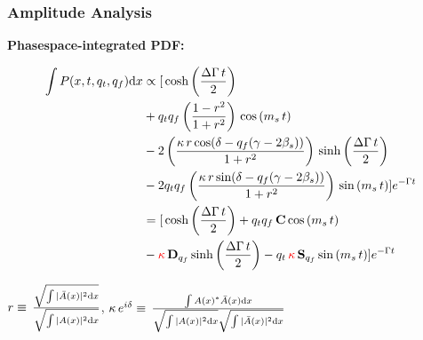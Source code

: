\documentclass{beamer}
\begin{document}
\begin{frame}
	\frametitle{Amplitude Analysis}

	\centering
	\small
	\textbf{Phasespace-integrated PDF:}
	\scriptsize
	\begin{block}{}
\begin{align*}
	\int P(x,t,q_t,q_f) \text d x &\propto   [
	\, \text{cosh} \left( \frac{\Delta \Gamma \, t}{2}\right) \\
	 & + q_t q_f \left( \frac{1-r^2}{1+r^2} \right) \, \text{cos} \left( m_s \, t \right)  \\
	 & -2 \left( \frac{\kappa \, r \, \text{cos}(\delta - q_f(\gamma - 2 \beta_s))}{1+r^2}  \right) \, \text{sinh} \left( \frac{\Delta \Gamma \, t}{2}\right)  \\
	 & -2 q_t q_f \left( \frac{\kappa \, r \, \text{sin}(\delta - q_f(\gamma - 2 \beta_s))}{1+r^2}   \right)\, \text{sin} \left( m_s \, t \right)  ]  e^{- \Gamma t} \\
	 &=   [
	\, \text{cosh} \left( \frac{\Delta \Gamma \, t}{2}\right) 
	  + q_t q_f \, \textbf{C} \, \text{cos} \left( m_s \, t \right)   \\
	  & - \textcolor{red}{\kappa} \, \textbf{D}_{q_f} \, \text{sinh} \left( \frac{\Delta \Gamma \, t}{2}\right)  
	  - q_t \, \textcolor{red}{\kappa} \, \textbf{S}_{q_f}\, \text{sin} \left( m_s \, t \right)  ]  e^{- \Gamma t}
\end{align*}
	\end{block}
\vspace{0.2cm}
\small
$r \equiv \, \frac{\sqrt{\int \vert \bar A(x) \vert^2\text d x }}{\sqrt{\int \vert A(x) \vert^2\text d x}} $, 
$	\kappa \, e^{i\delta} \equiv \, \frac{\int A(x)^{*}  \bar A(x)  \text d x}{\sqrt{\int \vert A(x) \vert^2\text d x} \sqrt{\int \vert \bar A(x) \vert^2\text d x}  }$ %

\end{frame}
\end{document}
